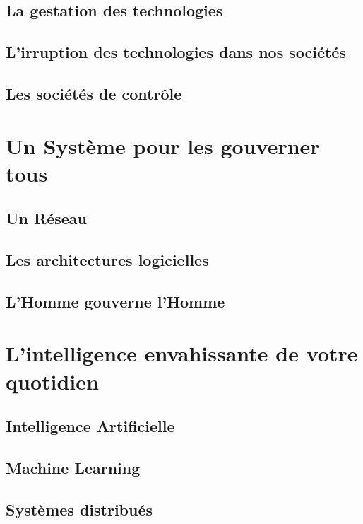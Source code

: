 \documentclass{report}
\begin{document}
    \section{La gestation des technologies} %
    \section{L'irruption des technologies dans nos sociétés}
    \section{Les sociétés de contrôle}

\chapter{Un Système pour les gouverner tous}
    \section{Un Réseau} %
    \section{Les architectures logicielles}
    \section{L'Homme gouverne l'Homme}

\chapter{L'intelligence envahissante de votre quotidien}
    \section{Intelligence Artificielle}
    \section{Machine Learning}
    \section{Systèmes distribués}

\newpage
\cite{Asimov:0}
\cite{Damasio:0}
\cite{Damasio:1}
\cite{Deleuze:0}
\cite{Deleuze:1}
\cite{Foucault:0}
\cite{Klein:0}
\cite{Marx:0}
\cite{Marx:1}
\cite{Moore:0}
\cite{Negri:0}
\cite{Nietzsche:0}
\cite{Pieces:0}
\cite{Rabhi:0}
\cite{MachineLearning:0}
\cite{MachineLearning:1}
\cite{ProgrammableCity:0}
\cite{ProgrammableCity:1}



\end{document}
